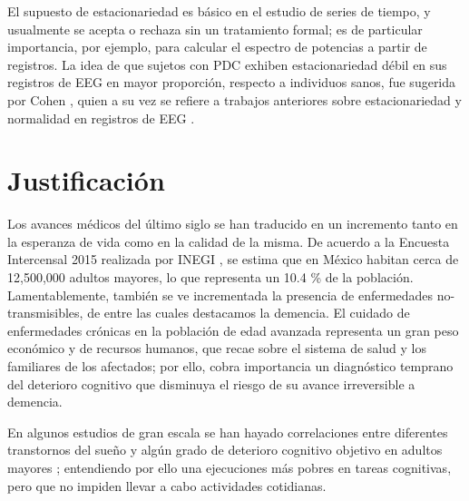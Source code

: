 El supuesto de estacionariedad es b\'asico en el estudio de series de tiempo, y usualmente se 
acepta o rechaza sin un tratamiento formal; es de particular importancia, por ejemplo, para 
calcular el espectro de potencias a partir de registros.
La idea de que sujetos con PDC exhiben estacionariedad d\'ebil en sus registros de EEG en mayor 
proporci\'on, respecto a individuos sanos, fue sugerida por Cohen \cite{Cohen77}, quien a su vez se 
refiere a trabajos anteriores sobre estacionariedad y normalidad en registros de EEG 
\cite{McEwen75,Sugimoto78,Kawabata73}.


\section{Justificaci\'on}

Los avances m\'edicos del \'ultimo siglo se han traducido en un incremento tanto en la esperanza de 
vida como en la calidad de la misma. 
De acuerdo a la Encuesta Intercensal 2015 realizada por INEGI \cite{Intercensal15}, se estima que
en M\'exico habitan cerca de 12,500,000 adultos mayores, lo que representa un 10.4 \%  de la 
poblaci\'on.
Lamentablemente, tambi\'en se ve incrementada la presencia de enfermedades no-transmisibles, de 
entre las cuales destacamos la demencia.
El cuidado de enfermedades cr\'onicas en la poblaci\'on de edad avanzada representa un gran peso 
econ\'omico y de recursos humanos, que recae sobre el sistema de salud y los familiares de los 
afectados; por ello, cobra importancia un diagn\'ostico temprano del deterioro cognitivo que 
disminuya el riesgo de su avance irreversible a demencia.

En algunos estudios de gran escala se han hayado correlaciones entre diferentes transtornos del 
sueño y algún grado de deterioro cognitivo objetivo en adultos mayores 
\cite{Amer13,Miyata13,Reid06,Potvin12}; entendiendo por ello una ejecuciones más pobres en tareas
cognitivas, pero que no impiden llevar a cabo actividades cotidianas.
%

